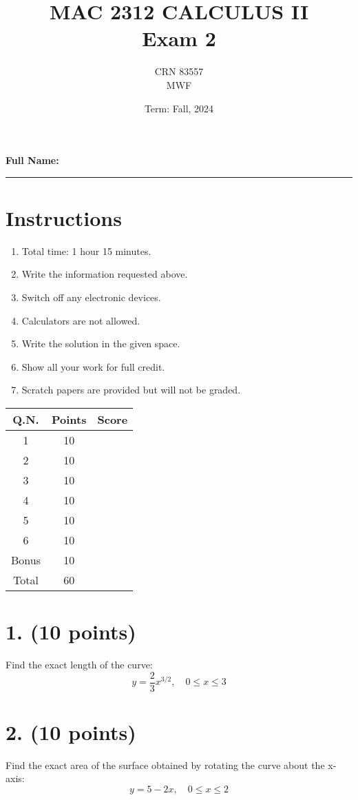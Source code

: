 \documentclass[12pt]{article}
\title{MAC 2312 CALCULUS II \\ Exam 2}
\date{Term: Fall, 2024}
\author{CRN 83557 \\ MWF}
\begin{document}
\maketitle

\noindent
\textbf{Full Name:} \rule{10cm}{0.4pt}

\vspace{0.5cm}

\section*{Instructions}
\begin{enumerate}
    \item Total time: 1 hour 15 minutes.
    \item Write the information requested above.
    \item Switch off any electronic devices.
    \item Calculators are not allowed.
    \item Write the solution in the given space.
    \item Show all your work for full credit.
    \item Scratch papers are provided but will not be graded.
\end{enumerate}

\vspace{0.5cm}

\noindent
\begin{tabular}{|c|c|c|}
    \hline
    Q.N. & Points & Score \\
    \hline
    1 & 10 & \\
    2 & 10 & \\
    3 & 10 & \\
    4 & 10 & \\
    5 & 10 & \\
    6 & 10 & \\
    Bonus & 10 & \\
    \hline
    Total & 60 & \\
    \hline
\end{tabular}

\newpage

\section*{1. (10 points)}
Find the exact length of the curve: \\
\[
y = \frac{2}{3}x^{3/2}, \quad 0 \leq x \leq 3
\]

\section*{2. (10 points)}
Find the exact area of the surface obtained by rotating the curve about the x-axis: \\
\[
y = 5 - 2x, \quad 0 \leq x \leq 2
\]
\end{document}
